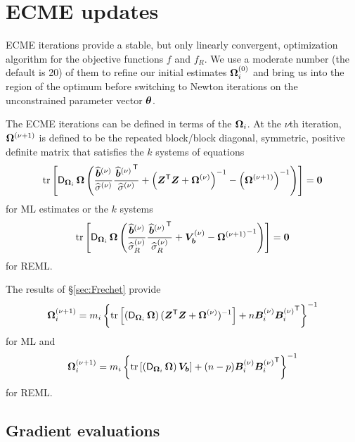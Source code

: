 \documentclass[12pt]{article}
\begin{document}
\section{ECME updates}
\label{sec:ECME}

ECME iterations provide a stable, but only linearly convergent,
optimization algorithm for the objective functions $f$ and $f_R$.  We
use a moderate number (the default is 20) of them to refine our
initial estimates $\bm{\Omega}_i^{(0)}$ and bring us into the region of
the optimum before switching to Newton iterations on the unconstrained
parameter vector $\bm{\theta}$.

The ECME iterations can be defined in terms of the $\bm{\Omega}_i$.  At
the $\nu$th iteration, $\bm{\Omega}^{(\nu+1)}$ is defined to be the
repeated block/block diagonal, symmetric, positive definite matrix
that satisfies the $k$ systems of equations
\begin{equation}
  \label{eq:theta1}
  \operatorname{tr}\left[\operatorname{\mathsf{D}}_{\bm{\Omega}_i}\bm{\Omega}\left(
      \frac{\widehat{\bm{b}}^{(\nu)}}{\widehat{\sigma}^{(\nu)}}
      \frac{\left.{\widehat{\bm{b}}}^{(\nu)}\right.^\mathsf{T}}{\widehat{\sigma}^{(\nu)}}+
      \left(\bm{Z}^\mathsf{T}\bm{Z}+\bm{\Omega}^{(\nu)}\right)^{-1}
      -\left(\bm{\Omega}^{(\nu+1)}\right)^{-1}\right)\right]=\bm{0}
\end{equation}
for ML estimates or the $k$ systems
\begin{equation}
  \label{eq:theta1R}
  \operatorname{tr}\left[\operatorname{\mathsf{D}}_{\bm{\Omega}_i}\bm{\Omega}\left(
      \frac{\widehat{\bm{b}}^{(\nu)}}{\widehat{\sigma}_R^{(\nu)}}
      \frac{\left.{\widehat{\bm{b}}}^{(\nu)}\right.^\mathsf{T}}{\widehat{\sigma}_R^{(\nu)}}+
      \bm{V}_{\bm{b}}^{(\nu)}
      -{\bm{\Omega}^{(\nu+1)}}^{-1}\right)\right]=\bm{0}
\end{equation}
for REML.

The results of \S\ref{sec:Frechet} provide
\begin{equation}
  \label{eq:theta1soln}
  \bm{\Omega}_i^{(\nu+1)}=m_i\left\{
    \operatorname{tr} \left[ \left( \operatorname{\mathsf{D}}_{\bm{\Omega}_i} \bm{\Omega} \right)
      (\bm{Z}^\mathsf{T}\bm{Z}+\bm{\Omega}^{(\nu)})^{-1}
    \right]+n\bm{B}_i^{(\nu)}{\bm{B}_i^{(\nu)}}^\mathsf{T}\right\}^{-1}
\end{equation}
for ML and
\begin{equation}
  \label{eq:theta1Rsoln}
  \bm{\Omega}_i^{(\nu+1)}=m_i\left\{
    \operatorname{tr} \left[ \left( \operatorname{\mathsf{D}}_{\bm{\Omega}_i} \bm{\Omega} \right)\bm{V}_{\bm{b}}
    \right]+(n-p)\bm{B}_i^{(\nu)}{\bm{B}_i^{(\nu)}}^\mathsf{T}\right\}^{-1} 
\end{equation}
for REML.
\subsection{Gradient evaluations}
\label{ssec:Gradient}
\end{document}
